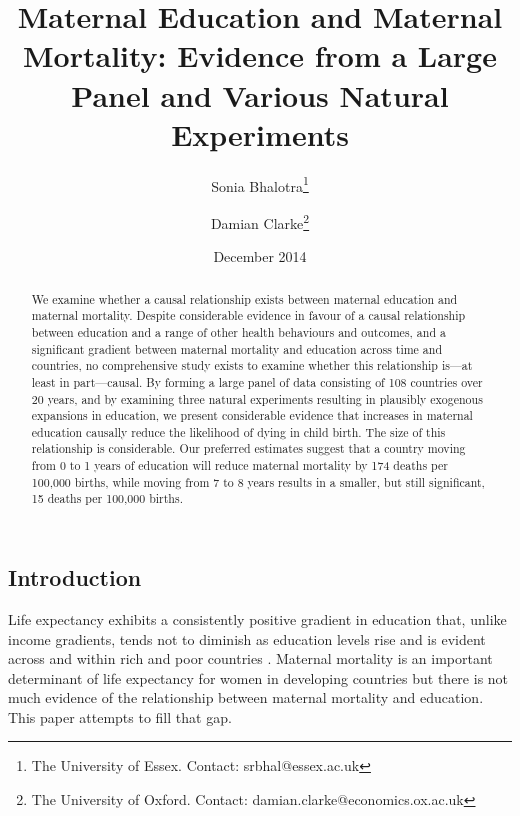 \documentclass{article}[12pt,subeqn]
\title{Maternal Education and Maternal Mortality: 
Evidence from a Large Panel and Various Natural Experiments}
\author{Sonia Bhalotra\thanks{The University of Essex. 
Contact: srbhal@essex.ac.uk}
\and{Damian Clarke\thanks{The University of Oxford. 
Contact: damian.clarke@economics.ox.ac.uk}}}
\date{December 2014}
\begin{document}
\begin{spacing}{1.4}

\maketitle

\begin{abstract}
We examine whether a causal relationship exists between maternal education and 
maternal mortality. Despite considerable evidence in favour of a causal 
relationship between education and a range of other health behaviours and 
outcomes, and a significant gradient between maternal mortality and education 
across time and countries, no comprehensive study exists to examine whether this 
relationship is---at least in part---causal.  By forming a large panel of data 
consisting of 108 countries over 20 years, and by examining three natural 
experiments resulting in plausibly exogenous expansions in education, we present 
considerable evidence that increases in maternal education causally reduce the 
likelihood of dying in child birth.  The size of this relationship is 
considerable.  Our preferred estimates suggest that a country moving from 0 to 1 
years of education will reduce maternal mortality by 174 deaths per 100,000 
births, while moving from 7 to 8 years results in a smaller, but still 
significant, 15 deaths per 100,000 births.
\end{abstract}

\section{Introduction}
Life expectancy exhibits a consistently positive gradient in education that, 
unlike income gradients, tends not to diminish as education levels rise and is 
evident across and within rich and poor countries \citep{RichardsBarry1998, 
KunstMackenbach1994, EloPreston1996, LlerasMuney2005, Mearaetal2008}. Maternal 
mortality is an important determinant of life expectancy for women in developing 
countries but there is not much evidence of the relationship between maternal 
mortality and education. This paper attempts to fill that gap.


\end{spacing}
\end{document}
